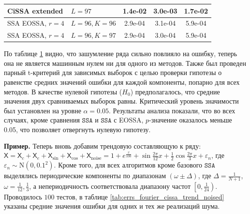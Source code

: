 \documentclass[12pt, specialist, subf
]{disser}
\theoremstyle{definition}
\newcommand{\SSA}{\texttt{SSA}}
\newcommand{\TS}{\mathsf{X}}
\begin{document}
\begin{table}[H]
\begin{tabular}{l|l|ccc}
		CiSSA extended     & $L = 97$             & 1.4e-02                          & 3.0e-03                          & 1.7e-02                   \\
		\hline
		SSA EOSSA, $r = 4$ & $L = 96, K = 96 $    & 2.9e-04                          & 3.1e-04                          & 5.9e-04                   \\
		SSA EOSSA, $r = 4$ & $L = 96, K = 97 $    & 2.9e-04                          & 3.0e-04                          & 5.9e-04                   \\
		\hline
	\end{tabular}
	\label{tab:errs_fourier_cissa_sin_cos_noised}
\end{table}



По таблице \ref{tab:errs_fourier_cissa_sin_cos_noised} видно, что зашумление ряда сильно повлияло на ошибку, теперь она не является машинным нулем ни для одного из методов. Также был проведен парный t-критерий для зависимых выборок с целью проверки гипотезы о равенстве средних значений ошибки для каждой компоненты, попарно для всех методов. В качестве нулевой гипотезы ($H_0$) предполагалось, что средние значения двух сравниваемых выборок равны. Критический уровень значимости был установлен на уровне $\alpha = 0.05$.
Результаты анализа показали, что во всех случаях, кроме сравнения $\SSA$ и $\SSA$ с EOSSA, $p$-значение оказалось меньше 0.05, что позволяет отвергнуть нулевую гипотезу.

\textbf{\large{Пример.}} Теперь вновь добавим трендовую составляющую к ряду: $\TS = \TS_{c} + \TS_e + \TS_{\sin} + \TS_{\cos} + \TS_{\mathrm{noise}} = 1 + e^{\frac{x}{100}} + \sin{\frac{2\pi}{12}x} + \frac{1}{2}\cos{\frac{2\pi}{3}x} + \varepsilon_n$, где $\varepsilon_n \sim \mathrm N(0, 0.1^2)$. Кроме того, для всех алгоритмов кроме базового $\SSA$ выделялись периодические компоненты по диапазонам $\left(\omega \pm \Delta \right)$, где $\Delta = \frac{1}{N+1}$, $\omega = \frac{1}{12}, \frac{1}{3}$, а непериодичность соответствовала диапазону частот $\left[0, \frac{1}{24} \right)$. Проводилось $100$ тестов, в таблице \ref{tab:errs_fourier_cissa_trend_noised} указаны средние значения ошибки для одних и тех же реализаций шума.
\end{document}
